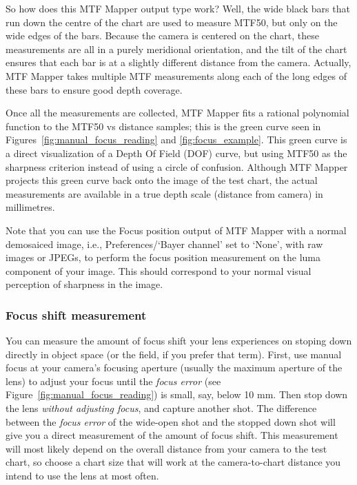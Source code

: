 \documentclass[a4paper]{article}
\begin{document}
So how does this MTF Mapper output type work? Well, the wide black bars that
run down the centre of the chart are used to measure MTF50, but only on the
wide edges of the bars. Because the camera is centered on the chart, these
measurements are all in a purely meridional orientation, and the tilt of the
chart ensures that each bar is at a slightly different distance from the
camera. Actually, MTF Mapper takes multiple MTF measurements along each of
the long edges of these bars to ensure good depth coverage.

Once all the measurements are collected, MTF Mapper fits a rational
polynomial function to the MTF50 vs distance samples; this is the green
curve seen in Figures~\ref{fig:manual_focus_reading} and
\ref{fig:focus_example}. This green curve is a direct visualization of a
Depth Of Field (DOF) curve, but using MTF50 as the sharpness criterion instead 
of using a circle of confusion. Although MTF Mapper projects this
green curve back onto the image of the test chart, the actual measurements
are available in a true depth scale (distance from camera) in millimetres.

Note that you can use the \textsf{Focus position} output of MTF Mapper with
a normal demosaiced image, i.e., \textsf{Preferences}/`Bayer
channel' set to `None', with raw images or JPEGs, to perform the focus
position measurement on the luma component of your image. This should
correspond to your normal visual perception of sharpness in the image.

\subsubsection{Focus shift measurement}
You can measure the amount of focus shift your lens experiences on stoping
down directly in object space (or the field, if you prefer that term). 
First, use manual focus at your camera's focusing aperture (usually the
maximum aperture of the lens) to adjust your focus until the \emph{focus
error} (see Figure~\ref{fig:manual_focus_reading}) is small, say, below 10
mm.  Then stop down the lens \emph{without adjusting focus}, and capture
another shot.  The difference between the \emph{focus error} of the
wide-open shot and the stopped down shot will give you a direct measurement
of the amount of focus shift. This measurement will most likely depend on
the overall distance from your camera to the test chart, so choose a chart
size that will work at the camera-to-chart distance you intend to use the
lens at most often.
\end{document}
